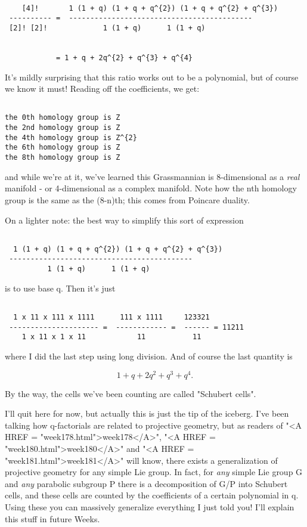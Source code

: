 \begin{verbatim}

    [4]!       1 (1 + q) (1 + q + q^{2}) (1 + q + q^{2} + q^{3})
 ---------- =  -------------------------------------------
 [2]! [2]!             1 (1 + q)      1 (1 + q)


            = 1 + q + 2q^{2} + q^{3} + q^{4}

\end{verbatim}
    
It's mildly surprising that this ratio works out to be a polynomial,
but of course we know it must!  Reading off the coefficients, we get:


\begin{verbatim}

the 0th homology group is Z
the 2nd homology group is Z
the 4th homology group is Z^{2}
the 6th homology group is Z
the 8th homology group is Z
\end{verbatim}
    
and while we're at it, we've learned this Grassmannian is 8-dimensional   
as a \emph{real} manifold - or 4-dimensional as a complex manifold.   Note
how the nth homology group is the same as the (8-n)th; this comes from
Poincare duality.

On a lighter note: the best way to simplify this sort of expression


\begin{verbatim}

  1 (1 + q) (1 + q + q^{2}) (1 + q + q^{2} + q^{3})
 -------------------------------------------   
          1 (1 + q)      1 (1 + q)
\end{verbatim}
    
is to use base q.  Then it's just 


\begin{verbatim}

  1 x 11 x 111 x 1111      111 x 1111     123321
 --------------------- =  ------------ =  ------ = 11211
    1 x 11 x 1 x 11            11           11 
\end{verbatim}
    
where I did the last step using long division.  And of course the
last quantity is 

$$

1 + q + 2q^{2} + q^{3} + q^{4}.
$$
    

By the way, the cells we've been counting are called "Schubert cells".

I'll quit here for now, but actually this is just the tip of the
iceberg.  I've been talking how q-factorials are related to projective
geometry, but as readers of "<A HREF = "week178.html">week178</A>", "<A HREF = "week180.html">week180</A>" and "<A HREF = "week181.html">week181</A>" will
know, there exists a generalization of projective geometry for any
simple Lie group.  In fact, for \emph{any} simple Lie group G and \emph{any}
parabolic subgroup P there is a decomposition of G/P into Schubert
cells, and these cells are counted by the coefficients of a certain
polynomial in q.  Using these you can massively generalize everything 
I just told you!  I'll explain this stuff in future Weeks.
 
